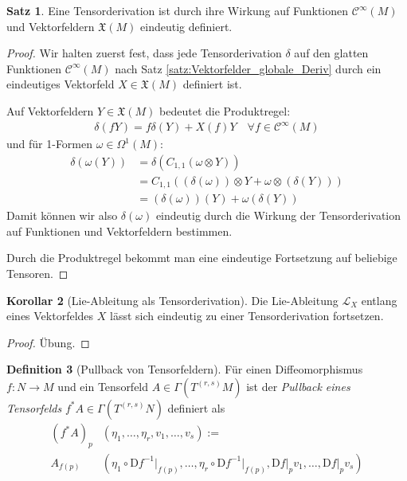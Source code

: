 \documentclass[a4paper]{scrreprt}
\numberwithin{equation}{chapter}
\newcommand{\DD}{\mathrm{D}}
\newcommand{\sC}{\mathcal{C}^{\infty}}
\newcommand{\vf}{\mathfrak{X}}
\theoremstyle{definition}
\newtheorem{defn}{Definition}[section]
\newtheorem{satz}[defn]{Satz}
\newtheorem{kor}[defn]{Korollar}
\newcommand{\bewUeb}{\begin{proof}Übung.\end{proof}}
\begin{document}
		\begin{satz}\label{satz:Fortsetzung_Derivationen}
			Eine Tensorderivation ist durch ihre Wirkung auf Funktionen $\sC(M)$ und Vektorfeldern $\vf(M)$ eindeutig definiert.
			\begin{proof}
				Wir halten zuerst fest, dass jede Tensorderivation $\delta$ auf den glatten Funktionen $\sC(M)$ nach Satz \ref{satz:Vektorfelder_globale_Deriv} durch ein eindeutiges Vektorfeld $X\in\vf(M)$ definiert ist.
				
				Auf Vektorfeldern $Y\in\vf(M)$ bedeutet die Produktregel:
				\begin{align*}
					\delta(fY)=f\delta(Y)+X(f)Y \quad\forall f\in\sC(M)
				\end{align*}
				und für 1-Formen $\omega\in\Omega^1(M)$:
				\begin{align*}
					\delta(\omega(Y))&=\delta(C_{1,1}(\omega\otimes Y))\\
					&=C_{1,1}((\delta(\omega))\otimes Y+\omega\otimes(\delta(Y)))\\
					&=(\delta(\omega))(Y)+\omega(\delta(Y))
				\end{align*}
				Damit können wir also $\delta(\omega)$ eindeutig durch die Wirkung der Tensorderivation auf Funktionen und Vektorfeldern bestimmen.
				
				Durch die Produktregel bekommt man eine eindeutige Fortsetzung auf beliebige Tensoren.
			\end{proof}
		\end{satz}
		
		\begin{kor}[Lie-Ableitung als Tensorderivation]
			Die Lie-Ableitung $\mathcal{L}_X$ entlang eines Vektorfeldes $X$ lässt sich eindeutig zu einer Tensorderivation fortsetzen.
			\bewUeb
		\end{kor}
		
		\begin{defn}[Pullback von Tensorfeldern]
			Für einen Diffeomorphismus $f\colon N\rightarrow M$ und ein Tensorfeld $A\in \Gamma(T^{(r,s)}M)$ ist der \emph{Pullback eines Tensorfelds} $f^*A\in\Gamma(T^{(r,s)}N)$ definiert als
			\begin{align*}
				(f^*A)_p&(\eta_1,\ldots,\eta_r,v_1,\ldots,v_s):=\\
				A_{f(p)}&(\eta_1\circ\DD f^{-1}\vert_{f(p)},\ldots,\eta_r\circ\DD f^{-1}\vert_{f(p)},\DD f\vert_pv_1,\ldots,\DD f\vert_pv_s)
			\end{align*}
		\end{defn}
		
\end{document}
